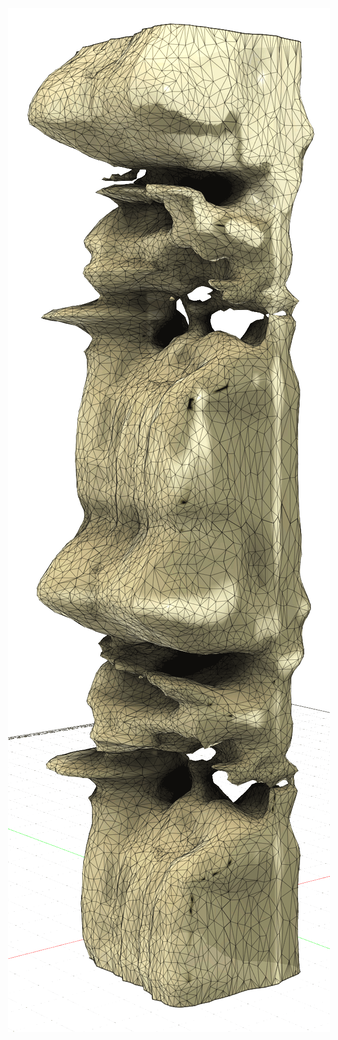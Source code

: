 \documentclass[twocolumn]{article}
\begin{document}

\begin{figure}[t]
\centering
  \includegraphics[width=0.7 \linewidth]{uppestcase3d}

\end{figure}
\end{document}
